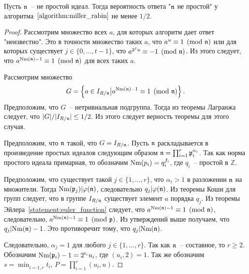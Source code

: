 \documentclass[_00_dissertation.tex]{subfiles}
\begin{document}
\begin{proposition}
    Пусть $\mathfrak{n}$~-- не простой идеал.
    Тогда вероятность ответа "$\mathfrak{n}$ не простой" у алгоритма~$\ref{algorithm:miller_rabin}$ не менее $1/2$.
\end{proposition}
\begin{proof}
    Рассмотрим множество всех $a$, для которых алгоритм дает ответ "неизвестно".
    Это в точности множество таких $a$, что $a^u \equiv 1 \pmod{\mathfrak{n}}$ или для которых существует $j \in \{0, \dots, t-1\}$, что $a^{2^{j}u} \equiv -1 \pmod{\mathfrak{n}}$.
    Из этого следует, что $a^{\textrm{Nm}(\mathfrak{n}) - 1} \equiv 1 \pmod{\mathfrak{n}}$ для всех таких $a$.

    Рассмотрим множество
    \begin{equation*}
        G = \left\{
            a \in I_{R/\mathfrak{n}} \big| a^{\textrm{Nm}(\mathfrak{n}) - 1} \equiv 1 \pmod{\mathfrak{n}}
        \right\}.
    \end{equation*}
    Предположим, что $G$~-- нетривиальная подгруппа.
    Тогда из теоремы Лагранжа следует, что $|G| / |I_{R/\mathfrak{n}}| \le 1/2$.
    Из этого следует верность теоремы для этого случая.

    Предположим, что $\mathfrak{n}$ такой, что $G = I_{R/\mathfrak{n}}$.
    Пусть $\mathfrak{n}$ раскладывается в произведение простых идеалов следующим образом $\mathfrak{n} = \prod_{i=1}^r \mathfrak{p}_i^{\alpha_i}$.
    Так как норма простого идеала примарная, то обозначим $\textrm{Nm}(p_i) = q_i^{f_i}$, где $q_i$~-- простой в $\mathbb{Z}$.

    Предположим, что существует такой $j \in \{1, \dots, r\}$, что $\alpha_i > 1$ в разложении $\mathfrak{n}$ на множители.
    Тогда $\textrm{Nm}(\mathfrak{p}_j) | \varphi(\mathfrak{n})$, следовательно $q_j | \varphi(\mathfrak{n})$.
    Из теоремы Коши для групп следует, что в группе $I_{R/\mathfrak{n}}$ существует элемент $a$ порядка $q_j$.
    Из теоремы Эйлера~\ref{statement:euler_function} следует, что $a^{\textrm{Nm}(\mathfrak{n}) - 1} \equiv 1 \pmod{\mathfrak{n}}$, следовательно, $a^{\textrm{Nm}(\mathfrak{n}) - 1} \equiv 1 \pmod{\mathfrak{p}}$.
    Из утверждений выше получаем, что $q_j | \textrm{Nm}(\mathfrak{n}) - 1$.
    Это противоречит тому, что $q_j | \textrm{Nm}(\mathfrak{n})$.

    Следовательно, $\alpha_j = 1$ для любого $j \in \{1, \dots, r\}$.
    Так как $\mathfrak{n}$~-- составное, то $r \ge 2$.
    Обозначим $\textrm{Nm}(\mathfrak{p}_i) - 1 = 2^{t_i} u_i$, где $(u_i, 2) = 1$.
    Так же обозначим $s = \min_{i=\overline{1, r}} t_i$, $P = \prod_{i=1}^r (u_i, u)$.


\end{proof}
\end{document}
